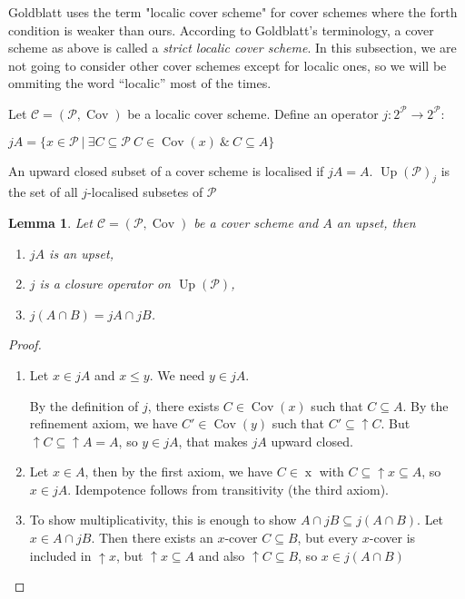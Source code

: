 \documentclass[a4paper]{article}
\theoremstyle{defin}
\theoremstyle{theorem}
\theoremstyle{claim}
\theoremstyle{prop}
\theoremstyle{lemma}
\newtheorem{lemma}{Lemma}
\theoremstyle{fact}
\theoremstyle{ex}
\theoremstyle{col}
\begin{document}
Goldblatt uses the term "localic cover scheme" for cover schemes where the forth condition is weaker than ours. According to Goldblatt's terminology, a cover scheme as above is called a \emph{strict localic cover scheme}. In this subsection, we are not going to consider other cover schemes except for localic ones, so we will be ommiting the word ``localic'' most of the times.

Let $\mathcal{C} = (\mathcal{P}, \operatorname{Cov})$ be a localic cover scheme. Define an operator $j : 2^\mathcal{P}
\to 2^\mathcal{P}$:
\begin{center}
$j A = \{ x \in \mathcal{P} \: | \: \exists C \subseteq \mathcal{P} \: C \in \operatorname{Cov}(x) \: \& \: C \subseteq A\}$
\end{center}

An upward closed subset of a cover scheme is localised if $j A = A$. $\operatorname{Up}(\mathcal{P})_j$ is the set of all $j$-localised subsetes of $\mathcal{P}$

\begin{lemma} Let $\mathcal{C} = (\mathcal{P}, \operatorname{Cov})$ be a cover scheme and $A$ an upset, then

\begin{enumerate}
\item $j A$ is an upset,
\item $j$ is a closure operator on $\operatorname{Up}(\mathcal{P})$,
\item $j (A \cap B) = j A \cap j B$.
\end{enumerate}

\end{lemma}

\begin{proof}
$ $
\begin{enumerate}
\item Let $x \in j A$ and $x \leq y$. We need $y \in j A$.

By the definition of $j$, there exists $C \in \operatorname{Cov}(x)$ such that $C \subseteq A$.
By the refinement axiom, we have $C' \in \operatorname{Cov}(y)$ such that $C' \subseteq \uparrow C$.
But $\uparrow C \subseteq \uparrow A = A$, so $y \in j A$, that makes $j A$ upward closed.
\item Let $x \in A$, then by the first axiom, we have $C \in \operatorname{x}$ with $C \subseteq \uparrow x \subseteq A$, so $x \in j A$. Idempotence follows from transitivity (the third axiom).

\item To show multiplicativity, this is enough to show $A \cap j B \subseteq j (A \cap B)$.
Let $x \in A \cap j B$. Then there exists an $x$-cover $C \subseteq B$, but every $x$-cover is included in $\uparrow x$, but $\uparrow x \subseteq A$ and also $\uparrow C \subseteq B$, so $x \in j (A \cap B)$
\end{enumerate}
\end{proof}
\end{document}
